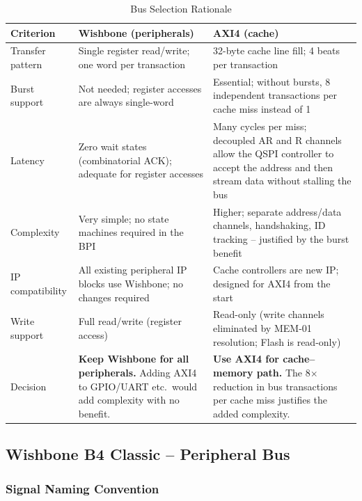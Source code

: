 \begin{table}[H]
\caption{Bus Selection Rationale}
\label{tab:asBusRationale}
\centering
\begin{tabularx}{\textwidth}{|l |X |X|}
  \hline
  Criterion & Wishbone (peripherals) & AXI4 (cache) \\
  \hline
  \hline
  Transfer pattern &
    Single register read/write; one word per transaction &
    32-byte cache line fill; 4 beats per transaction \\
  \hline
  Burst support &
    Not needed; register accesses are always single-word &
    Essential; without bursts, 8 independent transactions per
    cache miss instead of 1 \\
  \hline
  Latency &
    Zero wait states (combinatorial ACK); adequate for
    register accesses &
    Many cycles per miss; decoupled AR and R channels
    allow the QSPI controller to accept the address and
    then stream data without stalling the bus \\
  \hline
  Complexity &
    Very simple; no state machines required in the BPI &
    Higher; separate address/data channels, handshaking,
    ID tracking -- justified by the burst benefit \\
  \hline
  IP compatibility &
    All existing peripheral IP blocks use Wishbone;
    no changes required &
    Cache controllers are new IP; designed for AXI4 from
    the start \\
  \hline
  Write support &
    Full read/write (register access) &
    Read-only (write channels eliminated by MEM-01
    resolution; Flash is read-only) \\
  \hline
  Decision &
    \textbf{Keep Wishbone for all peripherals.}
    Adding AXI4 to GPIO/UART etc.\ would add complexity
    with no benefit. &
    \textbf{Use AXI4 for cache--memory path.}
    The 8$\times$ reduction in bus transactions per cache
    miss justifies the added complexity. \\
  \hline
\end{tabularx}
\end{table}

\subsection{Wishbone B4 Classic -- Peripheral Bus}

\subsubsection{Signal Naming Convention}

